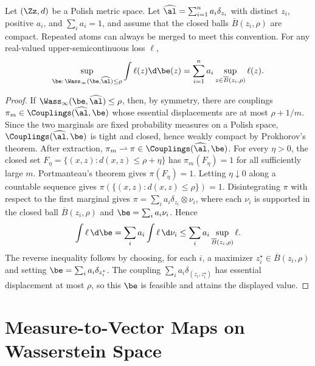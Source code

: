 \begin{prop}\label{prop-wasserstein-infty-dro}
		Let $(\Zz,d)$ be a Polish metric space. Let $\widehat{\al}=\sum_{i=1}^n a_i\delta_{z_i}$ with distinct $z_i$, positive $a_i$, and $\sum_i a_i=1$, and assume that the closed balls $\overline B(z_i,\rho)$ are compact. Repeated atoms can always be merged to meet this convention. For any real-valued upper-semicontinuous loss $\ell$,
	\[
		\sup_{\be:\,\Wass_\infty(\be,\widehat{\al})\leq\rho}
		\int \ell(z)\d\be(z)
		=
		\sum_{i=1}^n a_i\sup_{z\in\overline B(z_i,\rho)}\ell(z).
	\]
\end{prop}
\begin{proof}
	If $\Wass_\infty(\be,\widehat{\al})\leq\rho$, then, by symmetry, there are couplings $\pi_m\in\Couplings(\widehat{\al},\be)$ whose essential displacements are at most $\rho+1/m$. Since the two marginals are fixed probability measures on a Polish space, $\Couplings(\widehat{\al},\be)$ is tight and closed, hence weakly compact by Prokhorov's theorem. After extraction, $\pi_m\rightharpoonup\pi\in\Couplings(\widehat{\al},\be)$.
	For every $\eta>0$, the closed set $F_\eta=\{(x,z):d(x,z)\leq\rho+\eta\}$ has $\pi_m(F_\eta)=1$ for all sufficiently large $m$. Portmanteau's theorem gives $\pi(F_\eta)=1$. Letting $\eta\downarrow0$ along a countable sequence gives $\pi(\{(x,z):d(x,z)\leq\rho\})=1$.
	Disintegrating $\pi$ with respect to the first marginal gives $\pi=\sum_i a_i\delta_{z_i}\otimes\nu_i$, where each $\nu_i$ is supported in the closed ball $\overline B(z_i,\rho)$ and $\be=\sum_i a_i\nu_i$. Hence
	\[
		\int\ell\,\d\be
		=
		\sum_i a_i\int\ell\,\d\nu_i
		\leq
		\sum_i a_i\sup_{\overline B(z_i,\rho)}\ell.
	\]
	The reverse inequality follows by choosing, for each $i$, a maximizer $z_i^\star\in\overline B(z_i,\rho)$ and setting $\be=\sum_i a_i\delta_{z_i^\star}$. The coupling $\sum_i a_i\delta_{(z_i,z_i^\star)}$ has essential displacement at most $\rho$, so this $\be$ is feasible and attains the displayed value.
\end{proof}

\section{Measure-to-Vector Maps on Wasserstein Space}\label{sec-measure-to-vector-maps}

